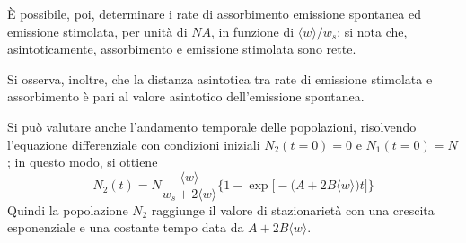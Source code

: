 \documentclass[11pt, a4paper]{scrartcl}
\theoremstyle{style}
\numberwithin{equation}{subsection}
\begin{document}
\begin{center}
	\begin{minipage}
		{.3\columnwidth}
\`E possibile, poi, determinare i rate di assorbimento emissione spontanea ed emissione stimolata, per unit\`a di $NA$, in funzione di $\langle w \rangle/w_s$; si nota che, asintoticamente, assorbimento e emissione stimolata sono rette.
\end{minipage}
	\hfill
	\begin{minipage}
		{.65\columnwidth}
	\centering
	\end{minipage}
\end{center}
Si osserva, inoltre, che la distanza asintotica tra rate di emissione stimolata e assorbimento \`e pari al valore asintotico dell'emissione spontanea.

Si pu\`o valutare anche l'andamento temporale delle popolazioni, risolvendo l'equazione differenziale con condizioni iniziali $N_2(t=0) = 0$ e $N_1 ( t= 0) = N$; in questo modo, si ottiene
\[
	N_2(t) = N \frac{\langle w \rangle}{w_s + 2 \langle w \rangle} \bigg\{ 1 - \exp\Big[ - \big(A + 2 B \langle w \rangle\big) t \Big]  \bigg\} 
\] 
Quindi la popolazione $N_2$ raggiunge il valore di stazionariet\`a con una crescita esponenziale e una costante tempo data da $A + 2 B \langle w \rangle$.
\end{document}
